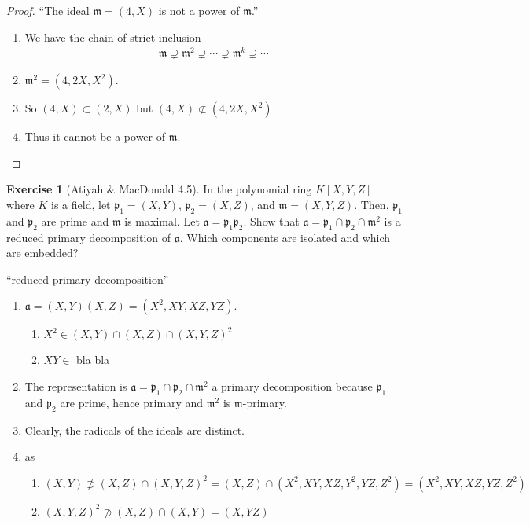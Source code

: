 \documentclass[a4paper]{book}
\theoremstyle{definition}
\newtheorem{exercise}{Exercise}[definition]
\begin{document}
\begin{proof}
    \noindent``The ideal \(\mathfrak{m} = (4, X)\) is not a power of \(\mathfrak{m}\).''
    \begin{enumerate}
        \item We have the chain of strict inclusion
        \begin{align*}
            \mathfrak{m} \supsetneq \mathfrak{m}^2 \supsetneq \cdots \supsetneq \mathfrak{m}^k \supsetneq \cdots
        \end{align*}
        \item \(\mathfrak{m}^2 = (4, 2X, X^2)\).
        \item So \((4, X) \subset (2, X)\) but \((4, X) \not\subset (4, 2X, X^2)\)
        \item Thus it cannot be a power of \(\mathfrak{m}\).
    \end{enumerate}
\end{proof}


\begin{exercise}[Atiyah \& MacDonald 4.5]
    In the polynomial ring \(K[X, Y, Z]\) where \(K\) is a field, let \(\mathfrak{p}_1 = (X, Y)\), \(\mathfrak{p}_2 = (X, Z)\), and \(\mathfrak{m} = (X, Y, Z)\). Then, \(\mathfrak{p}_1\) and \(\mathfrak{p}_2\) are prime and \(\mathfrak{m}\) is maximal. Let \(\mathfrak{a} = \mathfrak{p}_1 \mathfrak{p}_2\). Show that \(\mathfrak{a} = \mathfrak{p}_1 \cap \mathfrak{p}_2 \cap \mathfrak{m}^2\) is a reduced primary decomposition of \(\mathfrak{a}\). Which components are isolated and which are embedded?
\end{exercise}
``reduced primary decomposition''
\begin{enumerate}
    \item \(\mathfrak{a} = (X, Y) (X, Z) = (X^2, XY, XZ, YZ)\).
    \begin{enumerate}
        \item \(X^2 \in (X, Y) \cap (X, Z) \cap (X, Y, Z)^2\)
        \item \(XY \in\) bla bla
    \end{enumerate}
    \item The representation is \(\mathfrak{a} = \mathfrak{p}_1 \cap \mathfrak{p}_2 \cap \mathfrak{m}^2\) a primary decomposition because \(\mathfrak{p}_1\) and \(\mathfrak{p}_2\) are prime, hence primary and \(\mathfrak{m}^2\) is \(\mathfrak{m}\)-primary.
    \item Clearly, the radicals of the ideals are distinct.
    \item as
    \begin{enumerate}
        \item \((X, Y) \not\supset (X, Z) \cap (X, Y, Z)^2 = (X, Z) \cap (X^2, XY, XZ, Y^2, YZ, Z^2) = (X^2, XY, XZ, YZ, Z^2)\)
        \item \((X, Y, Z)^2 \not\supset (X, Z) \cap (X, Y) = (X, YZ)\)
    \end{enumerate}
\end{enumerate}
\end{document}
